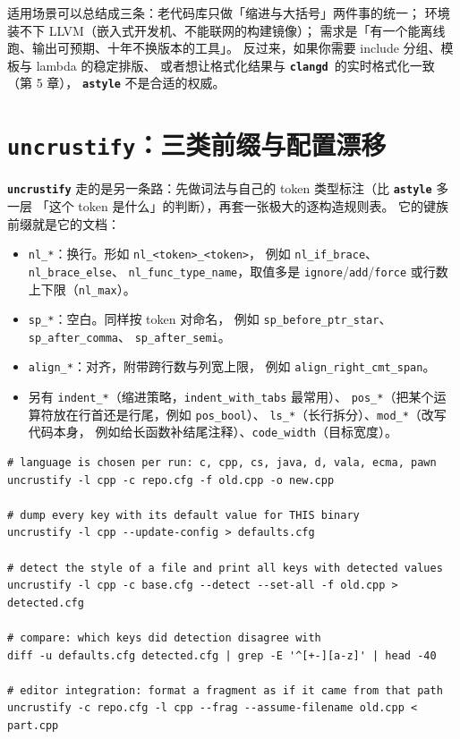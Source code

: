 \documentclass[12pt,a4paper,fontset=fandol]{ctexbook}
\newcommand{\Bk}{\discretionary{}{}{}}
\newcommand{\Lib}[1]{\textbf{\texttt{#1}}}
\newcommand{\CD}{\Lib{clangd}}
\begin{document}
适用场景可以总结成三条：老代码库只做「缩进与大括号」两件事的统一；
环境装不下 LLVM（嵌入式开发机、不能联网的构建镜像）；
需求是「有一个能离线跑、输出可预期、十年不换版本的工具」。
反过来，如果你需要 include 分组、模板与 lambda 的稳定排版、
或者想让格式化结果与 \CD\ 的实时格式化一致（第 5 章），
\Lib{astyle} 不是合适的权威。

\section{\Lib{uncrustify}：三类前缀与配置漂移}\label{sec:ch11-s2}

\Lib{uncrustify} 走的是另一条路：先做词法与自己的 token 类型标注（比 \Lib{astyle} 多一层
「这个 token 是什么」的判断），再套一张极大的逐构造规则表。
它的键族前缀就是它的文档：

\begin{itemize}
  \item \texttt{nl\_*}：换行。形如 \texttt{nl\_{\Bk}<token>\_{\Bk}<token>}，
    例如 \texttt{nl\_{\Bk}if\_{\Bk}brace}、\texttt{nl\_{\Bk}brace\_{\Bk}else}、
    \texttt{nl\_{\Bk}func\_{\Bk}type\_{\Bk}name}，取值多是 \texttt{ignore}/{\Bk}\texttt{add}/{\Bk}\texttt{force}
    或行数上下限（\texttt{nl\_max}）。
  \item \texttt{sp\_*}：空白。同样按 token 对命名，
    例如 \texttt{sp\_before\_ptr\_star}、\texttt{sp\_after\_comma}、
    \texttt{sp\_after\_semi}。
  \item \texttt{align\_*}：对齐，附带跨行数与列宽上限，
    例如 \texttt{align\_right\_cmt\_span}。
  \item 另有 \texttt{indent\_*}（缩进策略，\texttt{indent\_with\_tabs} 最常用）、
    \texttt{pos\_*}（把某个运算符放在行首还是行尾，例如 \texttt{pos\_bool}）、
    \texttt{ls\_*}（长行拆分）、\texttt{mod\_*}（改写代码本身，
    例如给长函数补结尾注释）、\texttt{code\_width}（目标宽度）。
\end{itemize}

\begin{lstlisting}[style=shellstyle,caption={\Lib{uncrustify} 的三个自查工具},label={lst:ch11-uncrustify}]
# language is chosen per run: c, cpp, cs, java, d, vala, ecma, pawn
uncrustify -l cpp -c repo.cfg -f old.cpp -o new.cpp

# dump every key with its default value for THIS binary
uncrustify -l cpp --update-config > defaults.cfg

# detect the style of a file and print all keys with detected values
uncrustify -l cpp -c base.cfg --detect --set-all -f old.cpp > detected.cfg

# compare: which keys did detection disagree with
diff -u defaults.cfg detected.cfg | grep -E '^[+-][a-z]' | head -40

# editor integration: format a fragment as if it came from that path
uncrustify -c repo.cfg -l cpp --frag --assume-filename old.cpp < part.cpp
\end{lstlisting}
\end{document}
